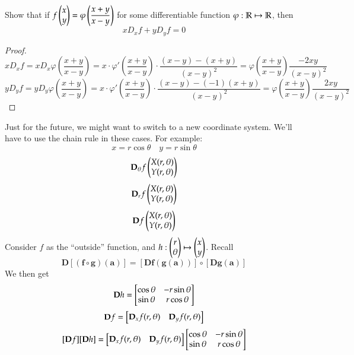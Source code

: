 Show that if $\displaystyle f\begin{pmatrix} x \\ y \end{pmatrix}=\varphi\left( \frac{x+y}{x-y} \right)$ for some differentiable function $\varphi : \mathbb{R} \mapsto \mathbb{R}$, then
\[xD_xf + yD_yf = 0\]
\begin{proof}
  \[xD_xf = xD_x \varphi\left(\frac{x+y}{x-y}\right)=x\cdot \varphi'\left(\frac{x+y}{x-y}\right)\cdot \frac{(x-y)-(x+y)}{(x-y)^2}=\varphi\left(\frac{x+y}{x-y}\right)\frac{-2xy}{(x-y)^2}\]
  \[yD_yf = yD_y \varphi\left(\frac{x+y}{x-y}\right)=x\cdot \varphi'\left(\frac{x+y}{x-y}\right)\cdot \frac{(x-y)-(-1)(x+y)}{(x-y)^2}=\varphi\left(\frac{x+y}{x-y}\right)\frac{2xy}{(x-y)^2}\]
\end{proof}

Just for the future, we might want to switch to a new coordinate system. We'll have to use the chain rule in these cases. For example:
\[x=r\cos{\theta} \quad y=r\sin{\theta}\]
\[\textbf{D}_\theta f\begin{pmatrix} X(r,\theta) \\ Y(r, \theta) \end{pmatrix}\]
\[\textbf{D}_r f\begin{pmatrix} X(r,\theta) \\ Y(r, \theta) \end{pmatrix}\]
\[\textbf{D} f\begin{pmatrix} X(r,\theta) \\ Y(r, \theta) \end{pmatrix}\]
Consider $f$ as the ``outside'' function, and $h : \begin{pmatrix} r \\ \theta \end{pmatrix}\mapsto \begin{pmatrix} x \\ y \end{pmatrix}$. Recall
\[\bm{D}[(\bm{f}\circ \bm{g})(\bm{a})]=[\bm{Df} (\bm{g}(\bm{a}))]\circ [\bm{Dg}(\bm{a})]\]
We then get
\[\textbf{D}h = \begin{bmatrix} \cos\theta & -r\sin\theta \\ \sin\theta & r\cos\theta \end{bmatrix}\]
\[\textbf{D}f = \begin{bmatrix} \textbf{D}_xf(r,\theta) & \textbf{D}_yf(r,\theta) \end{bmatrix}\]
\[[\textbf{D}f][\textbf{D}h]=\begin{bmatrix} \textbf{D}_xf(r,\theta) & \textbf{D}_yf(r,\theta) \end{bmatrix}\begin{bmatrix} \cos\theta & -r\sin\theta \\ \sin\theta & r\cos\theta \end{bmatrix}\]

